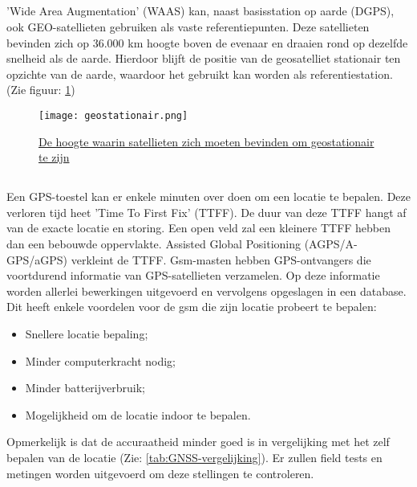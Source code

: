 \subsection{}
'Wide Area Augmentation' (WAAS) kan, naast basisstation op aarde (DGPS), ook GEO-satellieten gebruiken als vaste referentiepunten. Deze satellieten bevinden zich op 36.000 km hoogte boven de evenaar en draaien rond op dezelfde snelheid als de aarde. Hierdoor blijft de positie van de geosatelliet stationair ten opzichte van de aarde, waardoor het gebruikt kan worden als referentiestation.(Zie figuur: \ref{fig:geostationair})
\begin{figure}
	\texttt{[image: geostationair.png]}
	\caption[Geostationair]{\href{https://quizlet.com/393158527/de-kosmische-ruimte-de-ruimtevaart-en-haar-toepassingen-flash-cards/}{De hoogte waarin satellieten zich moeten bevinden om geostationair te zijn \autocite{fig_geostationair}}}
	\label{fig:geostationair} 
\end{figure}
\subsection{}
Een GPS-toestel kan er enkele minuten over doen om een locatie te bepalen. Deze verloren tijd heet 'Time To First Fix' (TTFF). De duur van deze TTFF hangt af van de exacte locatie en storing. Een open veld zal een kleinere TTFF hebben dan een bebouwde oppervlakte. Assisted Global Positioning (AGPS/A-GPS/aGPS) verkleint de TTFF. 
\newline
Gsm-masten hebben GPS-ontvangers die voortdurend informatie van GPS-satellieten verzamelen. Op deze informatie worden allerlei bewerkingen uitgevoerd en vervolgens opgeslagen in een database. Dit heeft enkele voordelen voor de gsm die zijn locatie probeert te bepalen:
\begin{itemize}
	\item Snellere locatie bepaling;
	\item Minder computerkracht nodig;
	\item Minder batterijverbruik;
	\item Mogelijkheid om de locatie indoor te bepalen.
\end{itemize} 
Opmerkelijk is dat de accuraatheid minder goed is in vergelijking met het zelf bepalen van de locatie (Zie: \ref{tab:GNSS-vergelijking}). Er zullen field tests en metingen worden uitgevoerd om deze stellingen te controleren. \autocite{agps}
